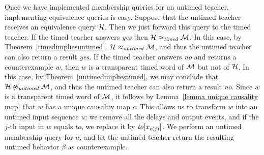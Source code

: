 Once we have implemented membership queries for an untimed teacher, implementing equivalence queries is easy.
Suppose that the untimed teacher receives an equivalence query ${\cal H}$.
Then we just forward this query to the timed teacher.
If the timed teacher answers \emph{yes} then ${\cal H} \approx_{\mathit{timed}} {\cal M}$.
In this case, by Theorem~\ref{timedimpliesuntimed}, ${\cal H} \approx_{\mathit{untimed}} {\cal M}$,
and thus the untimed teacher can also return a result \emph{yes}.
If the timed teacher answers \emph{no} and returns a counterexample $w$,
then $w$ is a transparent timed word of ${\cal M}$ but not of ${\cal H}$.
In this case, by Theorem~\ref{untimedimpliestimed}, we may conclude that
${\cal H} \not\approx_{\mathit{untimed}} {\cal M}$, and thus the untimed teacher can also return a result \emph{no}.
Since $w$ is a transparent timed word of ${\cal M}$, it follows by Lemma~\ref{lemma unique causality map}
that $w$ has a unique causality map $c$.
This allows us to transform $w$ into an untimed input sequence $u$: 
we remove all the delays and output events, and if the $j$-th
input in $w$ equals $\mathit{to}$, we replace it by $\mathit{to}[x_{c(j)}]$.
We perform an untimed membership query for $u$, and let the untimed teacher return the resulting 
untimed behavior $\beta$ as counterexample.






